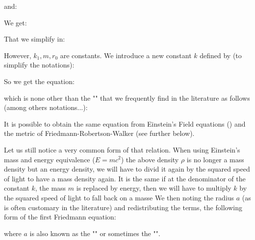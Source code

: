 	and:
	
	We get:
	
	That we simplify in:
	
	However, $k_1,m,r_0$ are constants. We introduce a new constant $k$ defined by (to simplify the notations):
	
	So we get the equation:
	
	which is none other than the "" that we frequently find in the literature as follows (among others notations...):
	
	It is possible to obtain the same equation from Einstein's Field equations () and the metric of Friedmann-Robertson-Walker (see further below).
	
	Let us still notice a very common form of that relation. When using Einstein's mass and energy equivalence ($E=mc^2$) the above density $\rho$ is no longer a mass density but an energy density, we will have to divid it again by the squared speed of light to have a mass density again. It is the same if at the denominator of the constant $k$, the mass $m$ is replaced by energy, then we will have to multiply $k$ by the squared speed of light to fall back on a masse We then noting the radius $a$ (as is often customary in the literature) and redistributing the terms, the following form of the first Friedmann equation:
	
	where $a$ is also known as the "" or sometimes the "".
	
